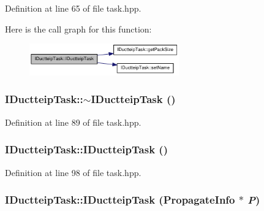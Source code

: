 Definition at line 65 of file task.hpp.

Here is the call graph for this function:\nopagebreak
\begin{figure}[H]
\begin{center}
\leavevmode
\includegraphics[width=183pt]{class_i_ductteip_task_af6e8ba2a01f02e8a354831083d27d6c5_cgraph}
\end{center}
\end{figure}
\hypertarget{class_i_ductteip_task_a3cd60ba06a40fc003699bc87ec8c2f54}{
\subsubsection[{$\sim$IDuctteipTask}]{\setlength{\rightskip}{0pt plus 5cm}IDuctteipTask::$\sim$IDuctteipTask ()}}
\label{class_i_ductteip_task_a3cd60ba06a40fc003699bc87ec8c2f54}


Definition at line 89 of file task.hpp.\hypertarget{class_i_ductteip_task_ac3e5ee9cc9a149d2d1fdcaf4f9bb6d4e}{
\subsubsection[{IDuctteipTask}]{\setlength{\rightskip}{0pt plus 5cm}IDuctteipTask::IDuctteipTask ()}}
\label{class_i_ductteip_task_ac3e5ee9cc9a149d2d1fdcaf4f9bb6d4e}


Definition at line 98 of file task.hpp.\hypertarget{class_i_ductteip_task_a9829e9023aab8fa4bc8e54f0064fff9a}{
\subsubsection[{IDuctteipTask}]{\setlength{\rightskip}{0pt plus 5cm}IDuctteipTask::IDuctteipTask ({\bf PropagateInfo} $\ast$ {\em P})}}
\label{class_i_ductteip_task_a9829e9023aab8fa4bc8e54f0064fff9a}


